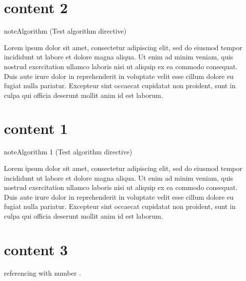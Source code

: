 

\pagestyle{empty}
\sphinxmaketitle
\pagestyle{plain}
\sphinxtableofcontents
\pagestyle{normal}
\label{\detokenize{index::doc}}



\chapter{content 2}
\label{\detokenize{algorithm/_algo_nonumber:content-2}}\label{\detokenize{algorithm/_algo_nonumber::doc}}\label{algorithm/_algo_nonumber:algorithm-0}
\begin{sphinxadmonition}{note}{Algorithm (Test algorithm directive)}



\sphinxAtStartPar
Lorem ipsum dolor sit amet, consectetur adipiscing elit, sed do eiusmod tempor incididunt ut labore et dolore magna aliqua. Ut enim ad minim veniam, quis nostrud exercitation ullamco laboris nisi ut aliquip ex ea commodo consequat. Duis aute irure dolor in reprehenderit in voluptate velit esse cillum dolore eu fugiat nulla pariatur. Excepteur sint occaecat cupidatat non proident, sunt in culpa qui officia deserunt mollit anim id est laborum.
\end{sphinxadmonition}


\chapter{content 1}
\label{\detokenize{algorithm/_algo_labeled_titled_with_classname:content-1}}\label{\detokenize{algorithm/_algo_labeled_titled_with_classname::doc}}\label{algorithm/_algo_labeled_titled_with_classname:test-algo-label}
\begin{sphinxadmonition}{note}{Algorithm 1 (Test algorithm directive)}



\sphinxAtStartPar
Lorem ipsum dolor sit amet, consectetur adipiscing elit, sed do eiusmod tempor incididunt ut labore et dolore magna aliqua. Ut enim ad minim veniam, quis nostrud exercitation ullamco laboris nisi ut aliquip ex ea commodo consequat. Duis aute irure dolor in reprehenderit in voluptate velit esse cillum dolore eu fugiat nulla pariatur. Excepteur sint occaecat cupidatat non proident, sunt in culpa qui officia deserunt mollit anim id est laborum.
\end{sphinxadmonition}


\chapter{content 3}
\label{\detokenize{algorithm/_algo_numbered_reference:content-3}}\label{\detokenize{algorithm/_algo_numbered_reference::doc}}
\sphinxAtStartPar
referencing with number {\hyperref[\detokenize{algorithm/_algo_labeled_titled_with_classname:test-algo-label}]{}}.


